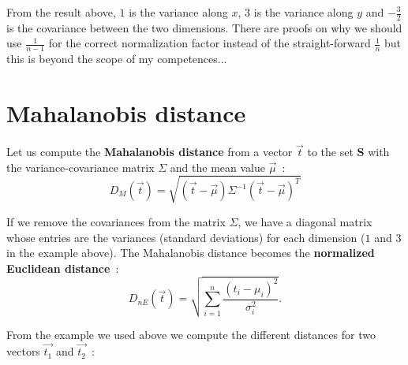 \documentclass[11pt,twocolumn]{amsart} %
\begin{document}
From the result above, $1$ is the variance along $x$, $3$ is the variance along $y$ and $-\frac{3}{2}$ is the covariance between the two dimensions. There are proofs on why we should use $\frac{1}{n-1}$ for the correct normalization factor instead of the straight-forward $\frac{1}{n}$ but this is beyond the scope of my competences...

\section{Mahalanobis distance}

Let us compute the \textbf{Mahalanobis distance} from a vector $\vec{t}$ to the set $\textbf{S}$ with the variance-covariance matrix $\Sigma$ and the mean value $\vec{\mu}$~:
\begin{equation*}
  D_M(\vec{t}) = \sqrt{(\vec{t} - \vec{\mu})\Sigma^{-1}(\vec{t} - \vec{\mu})^T}
\end{equation*}

If we remove the covariances from the matrix $\Sigma$, we have a diagonal matrix whose entries are the variances (standard deviations) for each dimension ($1$ and $3$ in the example above). The Mahalanobis distance becomes the \textbf{normalized Euclidean distance}~:
\begin{equation*}
  D_{nE}(\vec{t}) = \sqrt{\sum_{i=1}^{n}\frac{(t_i - \mu_i)^2}{\sigma_i^2}}.
\end{equation*}

From the example we used above we compute the different distances for two vectors $\vec{t_1}$ and $\vec{t_2}$~:
\end{document}
